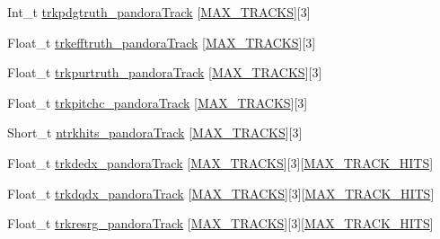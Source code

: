 \begin{DoxyCompactItemize}
\item 
Int\-\_\-t \hyperlink{classanatree_a80a42e7502ea74fea97d63ea47b18f8c}{trkpdgtruth\-\_\-pandora\-Track} \mbox{[}\hyperlink{anatree__core__v09410002_8h_a327fd4e796e4a0d78947524c96e4362e}{M\-A\-X\-\_\-\-T\-R\-A\-C\-K\-S}\mbox{]}\mbox{[}3\mbox{]}
\item 
Float\-\_\-t \hyperlink{classanatree_a4bd0c499d56e220df8aee0eca0b05b2c}{trkefftruth\-\_\-pandora\-Track} \mbox{[}\hyperlink{anatree__core__v09410002_8h_a327fd4e796e4a0d78947524c96e4362e}{M\-A\-X\-\_\-\-T\-R\-A\-C\-K\-S}\mbox{]}\mbox{[}3\mbox{]}
\item 
Float\-\_\-t \hyperlink{classanatree_a755d1114f45ff20099c25bc737f50b74}{trkpurtruth\-\_\-pandora\-Track} \mbox{[}\hyperlink{anatree__core__v09410002_8h_a327fd4e796e4a0d78947524c96e4362e}{M\-A\-X\-\_\-\-T\-R\-A\-C\-K\-S}\mbox{]}\mbox{[}3\mbox{]}
\item 
Float\-\_\-t \hyperlink{classanatree_a7acbb31c0dcf973553259ed30061b020}{trkpitchc\-\_\-pandora\-Track} \mbox{[}\hyperlink{anatree__core__v09410002_8h_a327fd4e796e4a0d78947524c96e4362e}{M\-A\-X\-\_\-\-T\-R\-A\-C\-K\-S}\mbox{]}\mbox{[}3\mbox{]}
\item 
Short\-\_\-t \hyperlink{classanatree_a5c339578d12ea63d45588d2ce9ef8313}{ntrkhits\-\_\-pandora\-Track} \mbox{[}\hyperlink{anatree__core__v09410002_8h_a327fd4e796e4a0d78947524c96e4362e}{M\-A\-X\-\_\-\-T\-R\-A\-C\-K\-S}\mbox{]}\mbox{[}3\mbox{]}
\item 
Float\-\_\-t \hyperlink{classanatree_a62256c9cc8a24288464c9da99060549c}{trkdedx\-\_\-pandora\-Track} \mbox{[}\hyperlink{anatree__core__v09410002_8h_a327fd4e796e4a0d78947524c96e4362e}{M\-A\-X\-\_\-\-T\-R\-A\-C\-K\-S}\mbox{]}\mbox{[}3\mbox{]}\mbox{[}\hyperlink{anatree__core__v09410002_8h_ae75eb9050f16aa034339f05572523070}{M\-A\-X\-\_\-\-T\-R\-A\-C\-K\-\_\-\-H\-I\-T\-S}\mbox{]}
\item 
Float\-\_\-t \hyperlink{classanatree_aea4e01f3e29dc7c8b9ef4e91d5768b70}{trkdqdx\-\_\-pandora\-Track} \mbox{[}\hyperlink{anatree__core__v09410002_8h_a327fd4e796e4a0d78947524c96e4362e}{M\-A\-X\-\_\-\-T\-R\-A\-C\-K\-S}\mbox{]}\mbox{[}3\mbox{]}\mbox{[}\hyperlink{anatree__core__v09410002_8h_ae75eb9050f16aa034339f05572523070}{M\-A\-X\-\_\-\-T\-R\-A\-C\-K\-\_\-\-H\-I\-T\-S}\mbox{]}
\item 
Float\-\_\-t \hyperlink{classanatree_a95549a4120ced04bca8ddfed88f2ef36}{trkresrg\-\_\-pandora\-Track} \mbox{[}\hyperlink{anatree__core__v09410002_8h_a327fd4e796e4a0d78947524c96e4362e}{M\-A\-X\-\_\-\-T\-R\-A\-C\-K\-S}\mbox{]}\mbox{[}3\mbox{]}\mbox{[}\hyperlink{anatree__core__v09410002_8h_ae75eb9050f16aa034339f05572523070}{M\-A\-X\-\_\-\-T\-R\-A\-C\-K\-\_\-\-H\-I\-T\-S}\mbox{]}

\end{DoxyCompactItemize}
